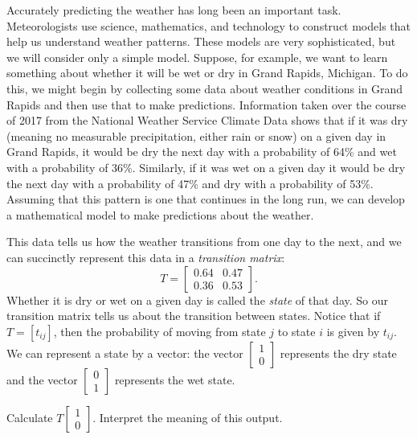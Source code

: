 \begin{example} Accurately predicting the weather has long been an important task. Meteorologists  use science, mathematics, and technology to construct models that help us understand weather patterns. These models are very sophisticated, but we will consider only a simple model. Suppose, for example, we want to learn something about whether it will be wet or dry in Grand Rapids, Michigan. To do this, we might begin by collecting some data about weather conditions in Grand Rapids and then use that to make predictions. Information taken over the course of 2017 from the National Weather Service Climate Data shows that if it was dry (meaning no measurable precipitation, either rain or snow) on a given day in Grand Rapids, it would be dry the next day with a probability of 64\% and wet with a probability of 36\%. Similarly, if it was wet on a given day it would be dry the next day with a probability of 47\% and dry with a probability of 53\%. Assuming that this pattern is one that continues in the long run, we can develop a mathematical model to make predictions about the weather. 

This data tells us how the weather transitions from one day to the next, and we can succinctly represent this data in a \emph{transition matrix}:
\begin{equation} \label{eq:weather_transition}
T = \left[ \begin{array}{cc} 0.64&0.47 \\ 0.36&0.53 \end{array} \right].
\end{equation}
Whether it is dry or wet on a given day is called the \emph{state} of that day. So our transition matrix tells us about the transition between states. Notice that if $T = [t_{ij}]$, then the probability of moving from state $j$ to state $i$ is given by $t_{ij}$. We can represent a state by a vector: the vector $\left[ \begin{array}{c} 1\\0 \end{array}\right]$ represents the dry state and the vector $\left[ \begin{array}{c} 0\\1 \end{array}\right]$ represents the wet state. 

	\ba
	\item Calculate $T\left[ \begin{array}{c} 1\\0 \end{array}\right] $. Interpret the meaning of this output.
	


\end{example}
